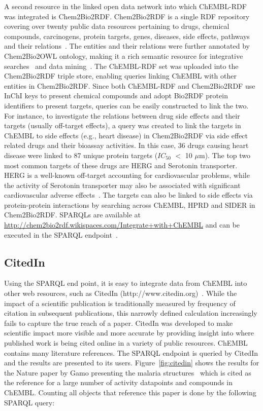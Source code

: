\documentclass[10pt]{bmc_article}
\newenvironment{bmcformat}{\begin{raggedright}\baselineskip20pt\sloppy\setboolean{publ}{false}}{\end{raggedright}\baselineskip20pt\sloppy}
\begin{document}
\begin{bmcformat}
A second resource in the linked open data network into which ChEMBL-RDF was integrated is Chem2Bio2RDF.
Chem2Bio2RDF is a single RDF repository covering over twenty public data resources pertaining to drugs, chemical compounds, carcinogens,
protein targets, genes, diseases, side effects, pathways and their relations~\cite{Chen2010}. The entities and their relations were
further annotated by Chem2Bio2OWL ontology, making it a rich semantic resource for integrative searches~\cite{Chen2012a} and
data mining~\cite{Chen2012b}. The ChEMBL-RDF set was uploaded into the Chem2Bio2RDF triple store, enabling
queries linking ChEMBL with other entities in Chem2Bio2RDF. Since both ChEMBL-RDF and Chem2Bio2RDF use InChI keys to present chemical
compounds and adopt Bio2RDF protein identifiers to present targets, queries can be easily constructed to link the two. For instance,
to investigate the relations between drug side effects and their targets (usually off-target effects), a query was created to link the
targets in ChEMBL to side effects (e.g., heart disease) in Chem2Bio2RDF via side effect related drugs and their bioassay activities.
In this case, 36 drugs causing heart disease were linked to 87 unique protein targets ($IC_{50}$ $<$ 10 $\mu$m). The top two most common targets
of these drugs are HERG and Serotonin transporter. HERG is a well-known off-target accounting for cardiovascular problems, while
the activity of Serotonin transporter may also be associated with significant cardiovascular adverse effects~\cite{Levy2006}. 
The targets can also be linked to side effects via protein-protein interactions by searching across ChEMBL, HPRD and SIDER in
Chem2Bio2RDF. SPARQLs are available at \url{http://chem2bio2rdf.wikispaces.com/Integrate+with+ChEMBL} and can be executed in the
SPARQL endpoint~\cite{Chen2010}.



\subsection*{CitedIn}

Using the SPARQL end point, it is easy to integrate data from ChEMBL into other web resources, such as CitedIn (http://www.citedin.org)~\cite{CitedIn2011}.
While the impact of a scientific publication is traditionally measured by frequency of citation in subsequent publications, this
narrowly defined calculation increasingly fails to capture the true reach of a paper. CitedIn was developed to make scientific
impact more visible and more accurate by providing insight into where published work is being cited online in a variety of public
resources. ChEMBL contains many literature references. The SPARQL endpoint is queried by CitedIn and the results are presented to its users.
Figure~\ref{fig:citedin} shows the results for the Nature paper by Gamo presenting the malaria structures~\cite{Gamo2010}
which is cited as the reference for a large number of activity datapoints and compounds in ChEMBL.
Counting all objects that reference this paper is done by the following SPARQL query:


\end{bmcformat}
\end{document}
